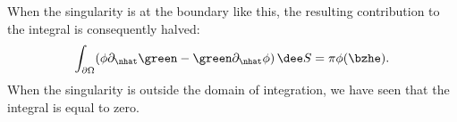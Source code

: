 \noindent When the singularity is at the boundary like this, the resulting contribution to the integral is consequently halved:
\[
    \int_{\partial\Omega} (\phi \partial_{\nhat} \green - \green \partial_{\nhat} \phi) \,\dee S = \pi\phi(\bzhe).
\]
When the singularity is outside the domain of integration, we have seen that the integral is equal to zero.